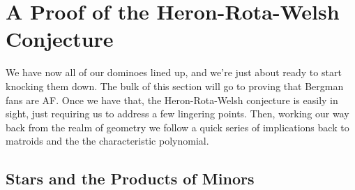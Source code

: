 \documentclass[12pt,oneside]{../../sfsuthesis}
\begin{document}
\chapter{A Proof of the Heron-Rota-Welsh Conjecture}

We have now all of our dominoes lined up, and we're just about ready to start knocking them down.
The bulk of this section will go to proving that Bergman fans are AF\@.
Once we have that, the Heron-Rota-Welsh conjecture is easily in sight, just requiring us to address a few lingering points.
Then, working our way back from the realm of geometry we follow a quick series of implications back to matroids and the the characteristic polynomial.

\section{Stars and the Products of Minors}
\end{document}
